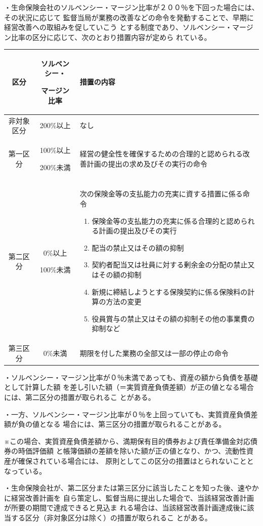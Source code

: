 \documentclass[report,gutter=10mm,fore-edge=10mm,uplatex,dvipdfmx]{jlreq}
\begin{document}
・生命保険会社のソルベンシー・マージン比率が２００％を下回った場合には、その状況に応じて
監督当局が業務の改善などの命令を発動することで、早期に経営改善への取組みを促していこう
とする制度であり、ソルベンシー・マージン比率の区分に応じて、次のとおり措置内容が定めら
れている。
\begin{tabularx}{\textwidth}{|c|c|X|}
\hline
 区分&ソルベンシー・\par マージン比率&措置の内容\\ \hline
 非対象区分& 200\%以上&なし\\ \hline
 第一区分& 100\%以上\par 200\%未満&経営の健全性を確保するための合理的と認められる改善計画の提出の求め及びその実行の命令\\ \hline
第二区分& 0\%以上\par 100\%未満&次の保険金等の支払能力の充実に資する措置に係る命令
\begin{enumerate}[(1)]
 \item 保険金等の支払能力の充実に係る合理的と認められる計画の提出及びその実行
 \item 配当の禁止又はその額の抑制
 \item 契約者配当又は社員に対する剰余金の分配の禁止又はその額の抑制
 \item 新規に締結しようとする保険契約に係る保険料の計算の方法の変更
 \item 役員賞与の禁止又はその額の抑制その他の事業費の抑制など
\end{enumerate}\\ \hline
第三区分& 0\%未満&期限を付した業務の全部又は一部の停止の命令\\ \hline
\end{tabularx}

・ソルベンシー・マージン比率が０％未満であっても、資産の額から負債を基礎として計算した額
を差し引いた額（＝実質資産負債差額）が正の値となる場合には、第二区分の措置が取られるこ
とがある。

・一方、ソルベンシー・マージン比率が０％を上回っていても、実質資産負債差額が負の値となる
場合には、第三区分の措置が取られることがある。

※この場合、実質資産負債差額から、満期保有目的債券および責任準備金対応債券の時価評価額
と帳簿価額の差額を除いた額が正の値となり、かつ、流動性資産が確保されている場合には、
原則としてこの区分の措置はとられないこととなっている。

・生命保険会社が、第二区分または第三区分に該当したことを知った後、速やかに経営改善計画を
自ら策定し、監督当局に提出した場合で、当該経営改善計画が所要の期間で達成できると見込ま
れる場合は、当該経営改善計画達成後に該当する区分（非対象区分は除く）の措置が取られるこ
とがある。
\end{document}
